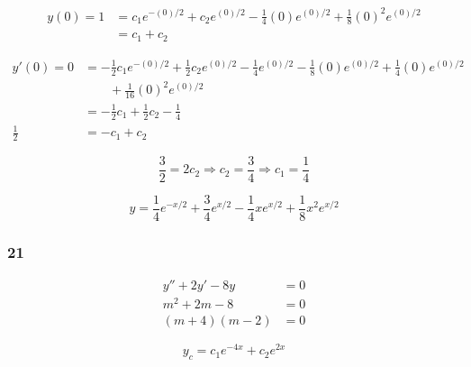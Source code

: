 \documentclass{article}
\begin{document}
\begin{align*}
  y(0) = 1 & = c_1 e^{-(0) / 2} + c_2 e^{(0) / 2} - \frac{1}{4} (0) e^{(0) / 2} + \frac{1}{8} (0)^2 e^{(0) / 2} \\
           & = c_1 + c_2
\end{align*}

\begin{align*}
  y'(0) = 0   & = -\frac{1}{2} c_1 e^{-(0) / 2} + \frac{1}{2} c_2 e^{(0) / 2} - \frac{1}{4} e^{(0) / 2} - \frac{1}{8} (0) e^{(0) / 2} + \frac{1}{4} (0) e^{(0) / 2} \\
              & \qquad + \frac{1}{16} (0)^2 e^{(0) / 2}                                                                                                             \\
              & = -\frac{1}{2} c_1 + \frac{1}{2} c_2 - \frac{1}{4}                                                                                                  \\
  \frac{1}{2} & = -c_1 + c_2
\end{align*}

\[\frac{3}{2} = 2 c_2 \Rightarrow c_2 = \frac{3}{4} \Rightarrow c_1 = \frac{1}{4}\]

\[y = \frac{1}{4} e^{-x / 2} + \frac{3}{4} e^{x / 2} - \frac{1}{4} x e^{x / 2} + \frac{1}{8} x^2 e^{x / 2}\]

\subsubsection{21}

\begin{align*}
  y'' + 2y' - 8y  & = 0 \\
  m^2 + 2m - 8    & = 0 \\
  (m + 4) (m - 2) & = 0
\end{align*}

\[y_c = c_1 e^{-4x} + c_2 e^{2x}\]
\end{document}
